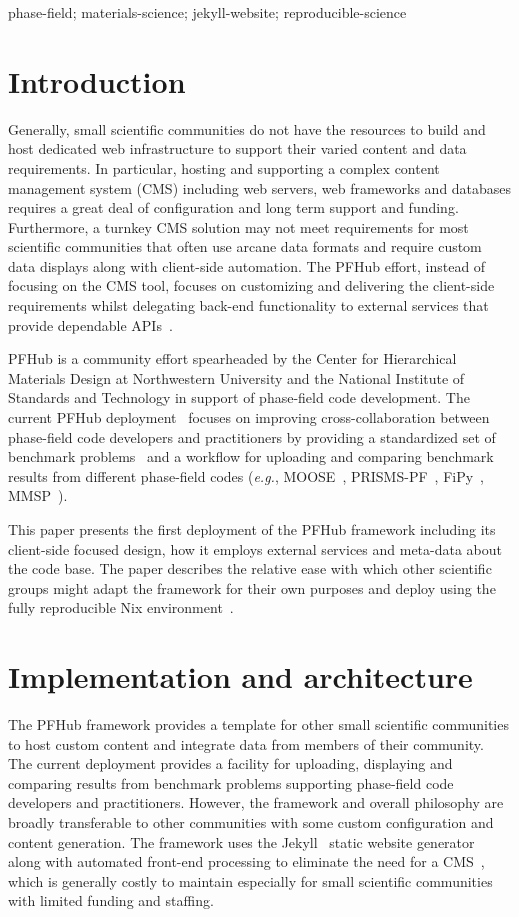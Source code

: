 \documentclass{jors}
\begin{document}
phase-field; materials-science; jekyll-website; reproducible-science

\section*{Introduction}

Generally, small scientific communities do not have the resources to
build and host dedicated web infrastructure to support their varied
content and data requirements. In particular, hosting and supporting a
complex content management system (CMS) including web servers, web
frameworks and databases requires a great deal of configuration and
long term support and funding. Furthermore, a turnkey CMS solution may
not meet requirements for most scientific communities that often use
arcane data formats and require custom data displays along with
client-side automation. The PFHub effort, instead of focusing on the
CMS tool, focuses on customizing and delivering the client-side
requirements whilst delegating back-end functionality to external
services that provide dependable APIs~\cite{cmsfree}.

PFHub is a community effort spearheaded by the Center for Hierarchical
Materials Design at Northwestern University and the National Institute
of Standards and Technology in support of phase-field code
development. The current PFHub deployment~\cite{pfhub} focuses on
improving cross-collaboration between phase-field code developers and
practitioners by providing a standardized set of benchmark
problems~\cite{bm1, bm2} and a workflow for uploading and comparing
benchmark results from different phase-field codes (\emph{e.g.},
MOOSE~\cite{moose}, PRISMS-PF~\cite{prisms-pf}, FiPy~\cite{fipy},
MMSP~\cite{mmsp}).

This paper presents the first deployment of the PFHub framework
including its client-side focused design, how it employs external
services and meta-data about the code base. The paper describes the
relative ease with which other scientific groups might adapt the
framework for their own purposes and deploy using the fully
reproducible Nix environment~\cite{nix}.

\section*{Implementation and architecture}

The PFHub framework provides a template for other small scientific
communities to host custom content and integrate data from members of
their community. The current deployment provides a facility for
uploading, displaying and comparing results from benchmark problems
supporting phase-field code developers and practitioners. However, the
framework and overall philosophy are broadly transferable to other
communities with some custom configuration and content generation. The
framework uses the Jekyll~\cite{jekyll} static website
generator~\cite{jekyll} along with automated front-end processing to
eliminate the need for a CMS~\cite{cmsfree}, which is generally costly
to maintain especially for small scientific communities with limited
funding and staffing.
\end{document}
